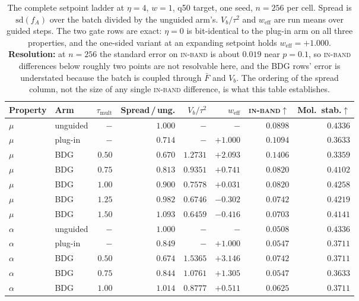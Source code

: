 \documentclass{article}
\newcommand{\Fbar}{\bar{F}}
\newcommand{\weff}{w_{\mathrm{eff}}}
\newcommand{\Vb}{V_{b}}
\newcommand{\ib}{\textsc{in-band}}
\begin{document}
\begin{table}[h]
\centering\scriptsize
\caption{The complete setpoint ladder at $\eta{=}4$, $w{=}1$, q50 target, one seed,
$n{=}256$ per cell. Spread is $\mathrm{sd}(f_A)$ over the batch divided by the
unguided arm's. $\Vb/\tau^2$ and $\weff$ are run means over guided steps. The two
gate rows are exact: $\eta{=}0$ is bit-identical to the plug-in arm on all three
properties, and the one-sided variant at an expanding setpoint holds
$\weff{=}{+}1.000$. \textbf{Resolution:} at $n{=}256$ the standard error on \ib{} is
about $0.019$ near $p{=}0.1$, so \ib{} differences below roughly two points are not
resolvable here, and the BDG rows' error is understated because the batch is
coupled through $\Fbar$ and $\Vb$. The ordering of the spread column, not the size
of any single \ib{} difference, is what this table establishes.}
\label{tab:a-ladder}
\setlength{\tabcolsep}{4pt}
\begin{tabular}{llrrrrrr}
\toprule
Property & Arm & $\tau_{\mathrm{mult}}$ & Spread\,/\,ung. & $\Vb/\tau^2$ & $\weff$ & \ib$\uparrow$ & Mol.\ stab.$\uparrow$ \\
\midrule
$\mu$ & unguided     & $-$    & $1.000$ & $-$      & $-$      & $0.0898$ & $0.4336$ \\
$\mu$ & plug-in      & $-$    & $0.714$ & $-$      & $+1.000$ & $0.1094$ & $0.3633$ \\
$\mu$ & BDG          & $0.50$ & $0.670$ & $1.2731$ & $+2.093$ & $0.1406$ & $0.3359$ \\
$\mu$ & BDG          & $0.75$ & $0.813$ & $0.9351$ & $+0.741$ & $0.0820$ & $0.4102$ \\
$\mu$ & BDG          & $1.00$ & $0.900$ & $0.7578$ & $+0.031$ & $0.0820$ & $0.4258$ \\
$\mu$ & BDG          & $1.25$ & $0.982$ & $0.6746$ & $-0.302$ & $0.0742$ & $0.4219$ \\
$\mu$ & BDG          & $1.50$ & $1.093$ & $0.6459$ & $-0.416$ & $0.0703$ & $0.4141$ \\
\midrule
$\alpha$ & unguided  & $-$    & $1.000$ & $-$      & $-$      & $0.0508$ & $0.4336$ \\
$\alpha$ & plug-in   & $-$    & $0.849$ & $-$      & $+1.000$ & $0.0547$ & $0.3711$ \\
$\alpha$ & BDG       & $0.50$ & $0.674$ & $1.5365$ & $+3.146$ & $0.0742$ & $0.3711$ \\
$\alpha$ & BDG       & $0.75$ & $0.844$ & $1.0761$ & $+1.305$ & $0.0547$ & $0.3633$ \\
$\alpha$ & BDG       & $1.00$ & $1.014$ & $0.8777$ & $+0.511$ & $0.0625$ & $0.3711$ \\

\end{tabular}
\end{table}
\end{document}
